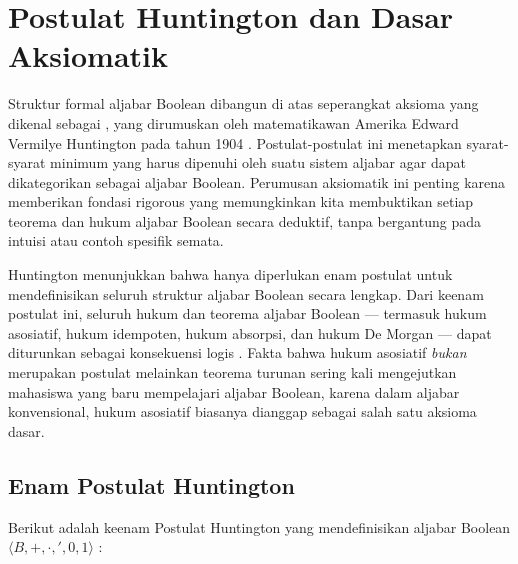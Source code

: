 \section{Postulat Huntington dan Dasar Aksiomatik}

Struktur formal aljabar Boolean dibangun di atas seperangkat aksioma yang dikenal sebagai , yang dirumuskan oleh matematikawan Amerika Edward Vermilye Huntington pada tahun 1904 \cite{huntington1904}. Postulat-postulat ini menetapkan syarat-syarat minimum yang harus dipenuhi oleh suatu sistem aljabar agar dapat dikategorikan sebagai aljabar Boolean. Perumusan aksiomatik ini penting karena memberikan fondasi rigorous yang memungkinkan kita membuktikan setiap teorema dan hukum aljabar Boolean secara deduktif, tanpa bergantung pada intuisi atau contoh spesifik semata.

Huntington menunjukkan bahwa hanya diperlukan enam postulat untuk mendefinisikan seluruh struktur aljabar Boolean secara lengkap. Dari keenam postulat ini, seluruh hukum dan teorema aljabar Boolean --- termasuk hukum asosiatif, hukum idempoten, hukum absorpsi, dan hukum De Morgan --- dapat diturunkan sebagai konsekuensi logis \cite{rosen2019}. Fakta bahwa hukum asosiatif \emph{bukan} merupakan postulat melainkan teorema turunan sering kali mengejutkan mahasiswa yang baru mempelajari aljabar Boolean, karena dalam aljabar konvensional, hukum asosiatif biasanya dianggap sebagai salah satu aksioma dasar.

\subsection{Enam Postulat Huntington}

Berikut adalah keenam Postulat Huntington yang mendefinisikan aljabar Boolean $\langle B, +, \cdot, ', 0, 1 \rangle$ \cite{huntington1904}:

